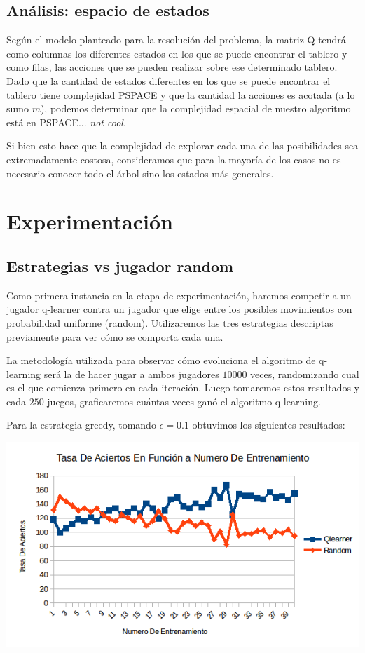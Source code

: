 \subsection{Análisis: espacio de estados}

Según el modelo planteado para la resolución del problema, la matriz Q tendrá como columnas los diferentes estados en los que se puede encontrar el tablero y como filas, las acciones que se pueden realizar sobre ese determinado tablero. Dado que la cantidad de estados diferentes en los que se puede encontrar el tablero tiene complejidad PSPACE y que la cantidad la acciones es acotada (a lo sumo $m$), podemos determinar que la complejidad espacial de nuestro algoritmo está en PSPACE... \textit{not cool}.

Si bien esto hace que la complejidad de explorar cada una de las posibilidades sea extremadamente costosa, consideramos que para la mayoría de los casos no es necesario conocer todo el árbol sino los estados más generales.



\pagebreak
\section{Experimentación}

\subsection{Estrategias vs jugador random}

Como primera instancia en la etapa de experimentación, haremos competir a un jugador q-learner contra un jugador que elige entre los posibles movimientos con probabilidad uniforme (random). Utilizaremos las tres estrategias descriptas previamente para ver cómo se comporta cada una. 

La metodología utilizada para observar cómo evoluciona el algoritmo de q-learning será la de hacer jugar a ambos jugadores $10000$ veces, randomizando cual es el que comienza primero en cada iteración. Luego tomaremos estos resultados y cada $250$ juegos, graficaremos cuántas veces ganó el algoritmo q-learning. 

Para la estrategia greedy, tomando $\epsilon=0.1$ obtuvimos los siguientes resultados:

\includegraphics[scale=0.5]{testing/greedy.png}

